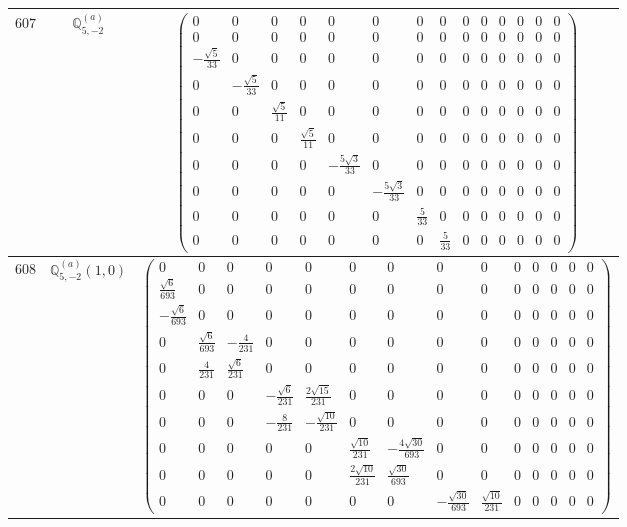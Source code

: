 \documentclass[fleqn,8pt,landscape]{jsarticle}
\begin{document}
\begin{center}
\begin{longtable}{ccc}
$ 607 $ & $ \mathbb{Q}_{5,-2}^{(a)} $ & $ \begin{pmatrix} 0 & 0 & 0 & 0 & 0 & 0 & 0 & 0 & 0 & 0 & 0 & 0 & 0 & 0 \\ 0 & 0 & 0 & 0 & 0 & 0 & 0 & 0 & 0 & 0 & 0 & 0 & 0 & 0 \\ - \frac{\sqrt{5}}{33} & 0 & 0 & 0 & 0 & 0 & 0 & 0 & 0 & 0 & 0 & 0 & 0 & 0 \\ 0 & - \frac{\sqrt{5}}{33} & 0 & 0 & 0 & 0 & 0 & 0 & 0 & 0 & 0 & 0 & 0 & 0 \\ 0 & 0 & \frac{\sqrt{5}}{11} & 0 & 0 & 0 & 0 & 0 & 0 & 0 & 0 & 0 & 0 & 0 \\ 0 & 0 & 0 & \frac{\sqrt{5}}{11} & 0 & 0 & 0 & 0 & 0 & 0 & 0 & 0 & 0 & 0 \\ 0 & 0 & 0 & 0 & - \frac{5 \sqrt{3}}{33} & 0 & 0 & 0 & 0 & 0 & 0 & 0 & 0 & 0 \\ 0 & 0 & 0 & 0 & 0 & - \frac{5 \sqrt{3}}{33} & 0 & 0 & 0 & 0 & 0 & 0 & 0 & 0 \\ 0 & 0 & 0 & 0 & 0 & 0 & \frac{5}{33} & 0 & 0 & 0 & 0 & 0 & 0 & 0 \\ 0 & 0 & 0 & 0 & 0 & 0 & 0 & \frac{5}{33} & 0 & 0 & 0 & 0 & 0 & 0 \end{pmatrix} $ \\ \hline
$ 608 $ & $ \mathbb{Q}_{5,-2}^{(a)}(1,0) $ & $ \begin{pmatrix} 0 & 0 & 0 & 0 & 0 & 0 & 0 & 0 & 0 & 0 & 0 & 0 & 0 & 0 \\ \frac{\sqrt{6}}{693} & 0 & 0 & 0 & 0 & 0 & 0 & 0 & 0 & 0 & 0 & 0 & 0 & 0 \\ - \frac{\sqrt{6}}{693} & 0 & 0 & 0 & 0 & 0 & 0 & 0 & 0 & 0 & 0 & 0 & 0 & 0 \\ 0 & \frac{\sqrt{6}}{693} & - \frac{4}{231} & 0 & 0 & 0 & 0 & 0 & 0 & 0 & 0 & 0 & 0 & 0 \\ 0 & \frac{4}{231} & \frac{\sqrt{6}}{231} & 0 & 0 & 0 & 0 & 0 & 0 & 0 & 0 & 0 & 0 & 0 \\ 0 & 0 & 0 & - \frac{\sqrt{6}}{231} & \frac{2 \sqrt{15}}{231} & 0 & 0 & 0 & 0 & 0 & 0 & 0 & 0 & 0 \\ 0 & 0 & 0 & - \frac{8}{231} & - \frac{\sqrt{10}}{231} & 0 & 0 & 0 & 0 & 0 & 0 & 0 & 0 & 0 \\ 0 & 0 & 0 & 0 & 0 & \frac{\sqrt{10}}{231} & - \frac{4 \sqrt{30}}{693} & 0 & 0 & 0 & 0 & 0 & 0 & 0 \\ 0 & 0 & 0 & 0 & 0 & \frac{2 \sqrt{10}}{231} & \frac{\sqrt{30}}{693} & 0 & 0 & 0 & 0 & 0 & 0 & 0 \\ 0 & 0 & 0 & 0 & 0 & 0 & 0 & - \frac{\sqrt{30}}{693} & \frac{\sqrt{10}}{231} & 0 & 0 & 0 & 0 & 0 \end{pmatrix} $ \\ \hline

\end{longtable}
\end{center}
\end{document}
